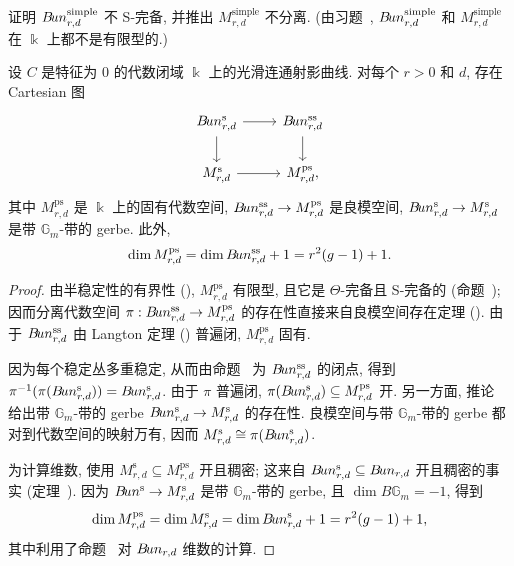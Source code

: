 \begin{exercise}\label{src:9.3.10}
证明 $B\!un_{r,d}^{\mathrm{simple}}$ 不 S-完备, 并推出 $M_{r,d}^{\mathrm{simple}}$ 不分离. (由习题~, $B\!un_{r,d}^{\mathrm{simple}}$ 和 $M_{r,d}^{\mathrm{simple}}$ 在 $\Bbbk$ 上都不是有限型的.)
\end{exercise}
\begin{theorem}\label{src:9.3.11}
设 $C$ 是特征为 $0$ 的代数闭域 $\Bbbk$ 上的光滑连通射影曲线. 对每个 $r>0$ 和 $d$, 存在 Cartesian 图
\[
\begin{tikzcd}[ampersand replacement=\&]
\cBun_{r,d}^{\mathrm s}\arrow[r]\arrow[d]\&\cBun_{r,d}^{\mathrm{ss}}\arrow[d]\\
M_{r,d}^{\mathrm s}\arrow[r]\&M_{r,d}^{\mathrm{ps}},
\end{tikzcd}
\]
其中 $M_{r,d}^{\mathrm{ps}}$ 是 $\Bbbk$ 上的固有代数空间, $B\!un_{r,d}^{\mathrm{ss}}\to M_{r,d}^{\mathrm{ps}}$ 是良模空间, $B\!un_{r,d}^{\mathrm s}\to M_{r,d}^{\mathrm s}$ 是带 $\mathbb G_m$-带的 gerbe. 此外,
\[
\dim M_{r,d}^{\mathrm{ps}}=\dim B\!un_{r,d}^{\mathrm{ss}}+1=r^2(g-1)+1.
\]
\end{theorem}
\begin{proof}
由半稳定性的有界性 (), $M_{r,d}^{\mathrm{ps}}$ 有限型, 且它是 $\Theta$-完备且 S-完备的 (命题~); 因而分离代数空间 $\pi:B\!un_{r,d}^{\mathrm{ss}}\to M_{r,d}^{\mathrm{ps}}$ 的存在性直接来自良模空间存在定理 (). 由于 $B\!un_{r,d}^{\mathrm{ss}}$ 由 Langton 定理 () 普遍闭, $M_{r,d}^{\mathrm{ps}}$ 固有.

因为每个稳定丛多重稳定, 从而由命题~ 为 $B\!un_{r,d}^{\mathrm{ss}}$ 的闭点, 得到 $\pi^{-1}(\pi(B\!un_{r,d}^{\mathrm s}))=B\!un_{r,d}^{\mathrm s}$. 由于 $\pi$ 普遍闭, $\pi(B\!un_{r,d}^{\mathrm s})\subseteq M_{r,d}^{\mathrm{ps}}$ 开. 另一方面, 推论~ 给出带 $\mathbb G_m$-带的 gerbe $B\!un_{r,d}^{\mathrm s}\to M_{r,d}^{\mathrm s}$ 的存在性. 良模空间与带 $\mathbb G_m$-带的 gerbe 都对到代数空间的映射万有, 因而 $M_{r,d}^{\mathrm s}\cong\pi(B\!un_{r,d}^{\mathrm s})$.

为计算维数, 使用 $M_{r,d}^{\mathrm s}\subseteq M_{r,d}^{\mathrm{ps}}$ 开且稠密; 这来自 $B\!un_{r,d}^{\mathrm s}\subseteq B\!un_{r,d}$ 开且稠密的事实 (定理~). 因为 $B\!un^{\mathrm s}\to M_{r,d}^{\mathrm s}$ 是带 $\mathbb G_m$-带的 gerbe, 且 $\dim B\mathbb G_m=-1$, 得到
\[
\dim M_{r,d}^{\mathrm{ps}}=\dim M_{r,d}^{\mathrm s}
=\dim B\!un_{r,d}^{\mathrm s}+1=r^2(g-1)+1,
\]
其中利用了命题~ 对 $B\!un_{r,d}$ 维数的计算.
\end{proof}
